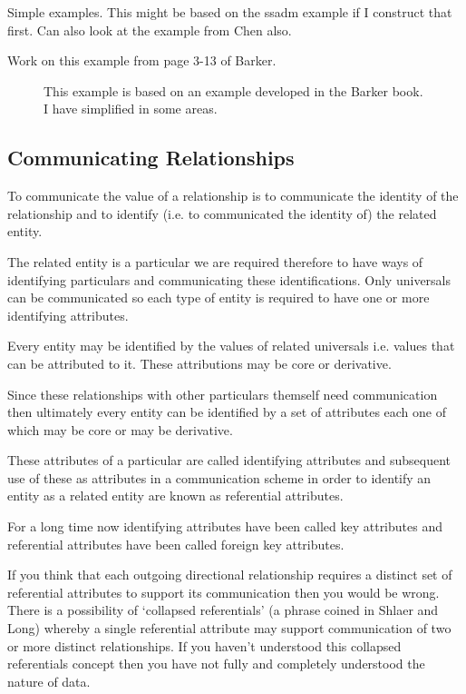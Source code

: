 \mynote Simple examples. This might be based on the ssadm example if I construct that first. Can also look at the example from Chen also.

\mynote Work on this example from page 3-13 of Barker.
\begin{figure}[H]
\begin{center}

\caption{This example is based on an example developed in the Barker book. I have simplified in some areas.}
\label{BoardingPass2}
\end{center}
\end{figure}

\subsection*{Communicating Relationships}
\mynote To communicate the value of a relationship is to communicate the identity of the relationship and  to identify (i.e. to communicated the identity of) the related entity. 

\mynote The related entity is a particular we are required therefore to have ways of identifying particulars and communicating these identifications.  
Only universals can be communicated so each type of entity is required 
to have one or more identifying attributes. 

\mynote Every entity may be identified by the values of related universals i.e. values that can be attributed to it. These attributions  may be core or derivative.


\mynote Since these relationships with other particulars themself need communication then ultimately every entity can be identified by a set of attributes each one of which may be core or may be derivative.  

\mynote
These attributes of a particular are called identifying attributes and subsequent use of these as attributes in a communication scheme in order to identify an entity as a related entity are known as referential attributes. 

\mynote For a long time now identifying attributes have been called key attributes and referential attributes have been called foreign key attributes. 

\mynote If you think that each outgoing directional relationship requires a distinct set of referential attributes to support its communication then you would be wrong. 
There is a possibility of `collapsed referentials' (a phrase coined in Shlaer and Long) whereby a single referential attribute may support communication of two or more distinct relationships. If you haven't understood this collapsed referentials concept then you have not  fully and completely understood the nature of data. 

